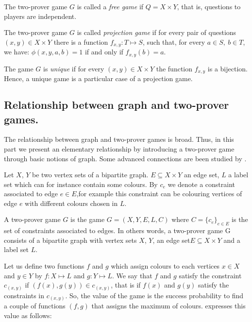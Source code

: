 The two-prover game $G$ is called a \textit{free game} if $Q=X \times Y$, that is, questions to players are  independent. 

The two-prover game $G$ is called \textit{projection game} if for every pair of questions $(x,y) \in X \times Y$ there is a function $f_{x,y}: T \longmapsto S$, such that, for every $a\in S, \ b\in T$, we have: $\phi(x,y,a,b)=1$ if and only if $f_{x,y}(b)=a.$ 

The game $G$ is \textit{unique} if for every $(x,y) \in X \times Y$ the function $f_{x,y}$ is a bijection. Hence, a unique game is a particular case of a projection game. 

\subsection{Relationship between graph and two-prover games.} \label{expander}

The relationship between graph and two-prover games is broad. Thus, in this part we present an elementary  relationship by introducing a two-prover game through basic notions of graph. Some advanced connections are been studied by  \cite{laekhanukit2014parameters,tamaki2015parallel,dinur2016multiplayer}.

Let $X$, $Y$ be two vertex sets of a bipartite graph. $E\subseteq X \times Y$ an edge set, $L$ a label set which can for instance contain some colours. By $c_e$ we denote a constraint associated to edge $e \in E$,for example  this constraint can be colouring vertices of edge $e$ with different colours chosen in $L$.

A two-prover game $G$ is the game $G=(X,Y,E,L,C)$ where $C=\{c_e\}_{e\in E}$ is the set of constraints associated to edges.
In others words, a two-prover game G consists of a bipartite graph with vertex
sets $X$, $Y$, an edge set$ E \subseteq X \times Y$ and a label set $L.$

 Let us define two functions $f$ and $g$ which assign colours to each vertices  $x \in X$ and $y \in Y$ by $f: X\longmapsto L$ and $g: Y\longmapsto L$. We say that $f$ and $g$ satisfy the constraint $c_{(x,y)}$ if $(f(x),g(y)) \in c_{(x,y)}$, that is if $f(x)$ and $g(y)$ satisfy the constraints in $c_{(x,y)}$. So, the value of the game is the success probability to find a couple of functions $(f,g)$ that assigns the maximum of colours.    \cite{tamaki2015parallel} expresses this value as follows:
 
